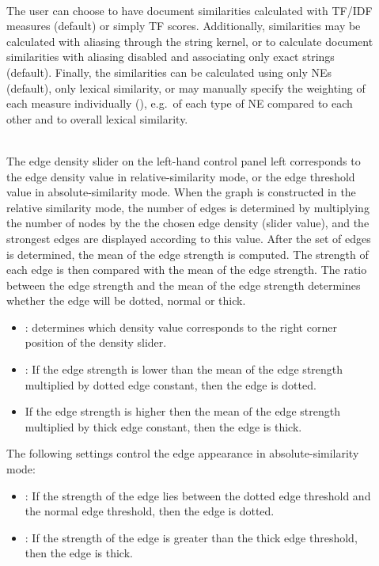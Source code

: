 \begin{description}
\item[] \hfill \\
The user can choose to have document similarities calculated with TF/IDF measures (default) or simply TF scores. Additionally, similarities may be calculated with aliasing through the string kernel, or to calculate document similarities with aliasing disabled and associating only exact strings (default). Finally, the similarities can be calculated using only NEs (default), only lexical similarity, or may manually specify the weighting of each measure individually (), e.g.\ of each type of NE compared to each other and to overall lexical similarity. 
\item[]\hfill \\
The edge density slider on the left-hand control panel left corresponds to the edge density value in relative-similarity mode, or the edge threshold value in absolute-similarity mode. When the graph is constructed in the relative similarity mode, the number of edges is determined by multiplying the number of nodes by the the chosen edge density (slider value), and the strongest edges are displayed according to this value. After the set of edges is determined, the mean of the edge strength is computed. The strength of each edge is then compared with the mean of the edge strength. The ratio between the edge strength and the mean of the edge strength determines whether the edge will be dotted, normal or thick.

\begin{itemize}
\item {}: determines which density value corresponds to the right corner position of the density slider.

\item {}: If the edge strength is lower than the mean of the edge strength multiplied by dotted edge constant, then the edge is dotted.

\item {} If the edge strength is higher then the mean of the edge strength multiplied by thick edge constant, then the edge is thick.
\end{itemize}

The following settings control the edge appearance in absolute-similarity mode:

\begin{itemize}
\item {}: If the strength of the edge lies between the dotted edge threshold and the normal edge threshold, then the edge is dotted.
\item {}: If the strength of the edge is greater than the thick edge threshold, then the edge is thick.
\end{itemize}


\end{description}
